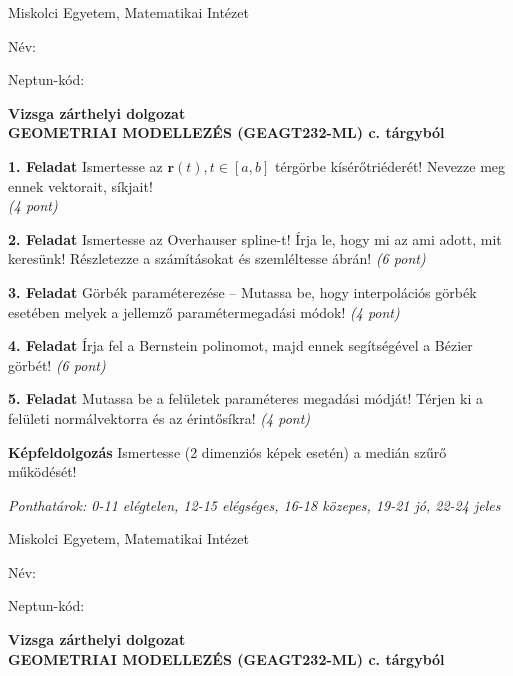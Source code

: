 \documentclass[a4paper]{article}
\begin{document}
\pagestyle{empty}

Miskolci Egyetem, Matematikai Intézet

\hskip 10cm Név:

\medskip

\hskip 10cm Neptun-kód:

\begin{center}
   \large \textbf{Vizsga zárthelyi dolgozat\\
   GEOMETRIAI MODELLEZÉS (GEAGT232-ML) c. tárgyból}
\end{center}

\bigskip

\noindent \textbf{1. Feladat}
Ismertesse az $\textbf{r}(t), t \in [a, b]$ térgörbe kísérőtriéderét! Nevezze meg ennek vektorait, síkjait! \\
\textit{(4 pont)}

\bigskip

\noindent \textbf{2. Feladat}
Ismertesse az Overhauser spline-t!
Írja le, hogy mi az ami adott, mit keresünk! Részletezze a számításokat és szemléltesse ábrán!
\textit{(6 pont)}

\bigskip

\noindent \textbf{3. Feladat}
Görbék paraméterezése -- Mutassa be, hogy interpolációs görbék esetében melyek a jellemző paramétermegadási módok!
\textit{(4 pont)}

\bigskip

\noindent \textbf{4. Feladat}
Írja fel a Bernstein polinomot, majd ennek segítségével a Bézier görbét!
\textit{(6 pont)}

\bigskip

\noindent \textbf{5. Feladat}
Mutassa be a felületek paraméteres megadási módját! Térjen ki a felületi normálvektorra és az érintősíkra!
\textit{(4 pont)}

\bigskip

\noindent \textbf{Képfeldolgozás} Ismertesse (2 dimenziós képek esetén) a medián szűrő működését!

\bigskip

\noindent \textit{Ponthatárok: 0-11 elégtelen, 12-15 elégséges, 16-18 közepes, 19-21 jó, 22-24 jeles}

\newpage


Miskolci Egyetem, Matematikai Intézet

\hskip 10cm Név:

\medskip

\hskip 10cm Neptun-kód:

\begin{center}
	\large \textbf{Vizsga zárthelyi dolgozat\\
		GEOMETRIAI MODELLEZÉS (GEAGT232-ML) c. tárgyból}
\end{center}
\end{document}
